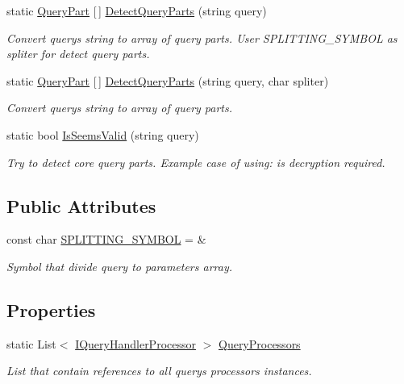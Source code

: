 \begin{DoxyCompactItemize}
static \mbox{\hyperlink{struct_uniform_queries_1_1_query_part}{Query\+Part}} \mbox{[}$\,$\mbox{]} \mbox{\hyperlink{class_uniform_queries_1_1_a_p_i_a013ca0eff0e67d7f30a6be289312b859}{Detect\+Query\+Parts}} (string query)
\begin{DoxyCompactList}\small\item\em Convert query\textquotesingle{}s string to array of query parts. User S\+P\+L\+I\+T\+T\+I\+N\+G\+\_\+\+S\+Y\+M\+B\+OL as spliter for detect query parts. \end{DoxyCompactList}\item 
static \mbox{\hyperlink{struct_uniform_queries_1_1_query_part}{Query\+Part}} \mbox{[}$\,$\mbox{]} \mbox{\hyperlink{class_uniform_queries_1_1_a_p_i_ab5875a3346878ba21ab331ba07889e92}{Detect\+Query\+Parts}} (string query, char spliter)
\begin{DoxyCompactList}\small\item\em Convert query\textquotesingle{}s string to array of query parts. \end{DoxyCompactList}\item 
static bool \mbox{\hyperlink{class_uniform_queries_1_1_a_p_i_a76acc6d6941a7a30d0ed87f69eab3434}{Is\+Seems\+Valid}} (string query)
\begin{DoxyCompactList}\small\item\em Try to detect core query parts. Example case of using\+: is decryption required. \end{DoxyCompactList}\end{DoxyCompactItemize}
\subsection*{Public Attributes}
\begin{DoxyCompactItemize}
\item 
const char \mbox{\hyperlink{class_uniform_queries_1_1_a_p_i_aa906970223172f9f2068baa410b621d8}{S\+P\+L\+I\+T\+T\+I\+N\+G\+\_\+\+S\+Y\+M\+B\+OL}} = \textquotesingle{}\&\textquotesingle{}
\begin{DoxyCompactList}\small\item\em Symbol that divide query to parameters array. \end{DoxyCompactList}\end{DoxyCompactItemize}
\subsection*{Properties}
\begin{DoxyCompactItemize}
\item 
static List$<$ \mbox{\hyperlink{interface_uniform_queries_1_1_i_query_handler_processor}{I\+Query\+Handler\+Processor}} $>$ \mbox{\hyperlink{class_uniform_queries_1_1_a_p_i_a8fe90206df6a1ae2b052b82c30a32037}{Query\+Processors}}
\begin{DoxyCompactList}\small\item\em List that contain references to all query\textquotesingle{}s processors instances. \end{DoxyCompactList}\end{DoxyCompactItemize}
